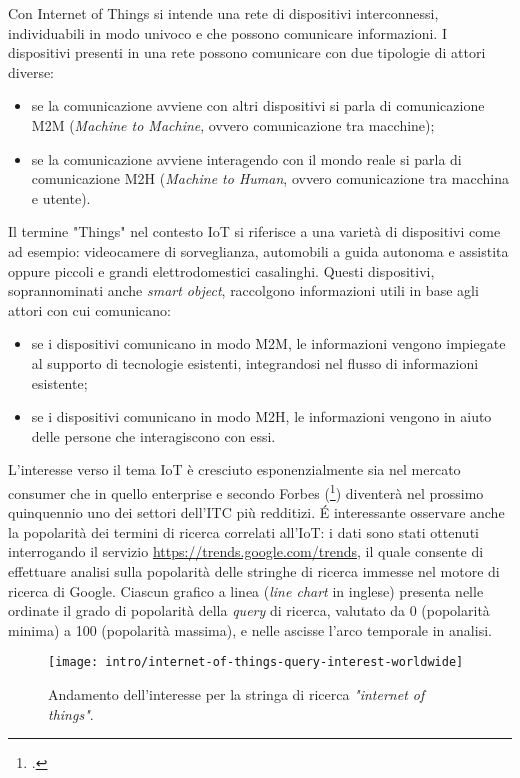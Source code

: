 Con Internet of Things si intende una rete di dispositivi interconnessi, individuabili in modo univoco e che possono comunicare informazioni.
I dispositivi presenti in una rete possono comunicare con due tipologie di attori diverse:
\begin{itemize}
  \item se la comunicazione avviene con altri dispositivi si parla di comunicazione M2M (\textit{Machine to Machine}, ovvero comunicazione tra macchine);
  \item se la comunicazione avviene interagendo con il mondo reale si parla di comunicazione M2H (\textit{Machine to Human}, ovvero comunicazione tra macchina e utente).
\end{itemize}


Il termine "Things" nel contesto IoT si riferisce a una varietà di dispositivi come ad esempio: videocamere di sorveglianza, automobili a guida autonoma e assistita oppure piccoli e grandi elettrodomestici casalinghi. Questi dispositivi, soprannominati anche \textit{smart object}, raccolgono informazioni utili in base agli attori con cui comunicano:
\begin{itemize}
  \item se i dispositivi comunicano in modo M2M, le informazioni vengono impiegate al supporto di tecnologie esistenti, integrandosi nel flusso di informazioni esistente;
  \item se i dispositivi comunicano in modo M2H, le informazioni vengono in aiuto delle persone che interagiscono con essi.
\end{itemize}


L'interesse verso il tema IoT è cresciuto esponenzialmente sia nel mercato consumer che in quello enterprise e secondo Forbes (\footcite{site:forbes-iot}) diventerà nel prossimo quinquennio uno dei settori dell'ITC più redditizi.
É interessante osservare anche la popolarità dei termini di ricerca correlati all'IoT: i dati sono stati ottenuti interrogando il servizio \url{https://trends.google.com/trends}, il quale consente di effettuare analisi sulla popolarità delle stringhe di ricerca immesse nel motore di ricerca di Google.
Ciascun grafico a linea (\textit{line chart} in inglese) presenta nelle ordinate il grado di popolarità della \textit{query} di ricerca, valutato da 0 (popolarità minima) a 100 (popolarità massima), e nelle ascisse l'arco temporale in analisi.

\begin{figure}[!ht]
    \centering
    \texttt{[image: intro/internet-of-things-query-interest-worldwide]}
    \caption{Andamento dell'interesse per la stringa di ricerca \textit{"internet of things"}. \\ \cite{site:iot-long-trend}}
    \label{fig:internet-of-things-query-interest}
\end{figure}

